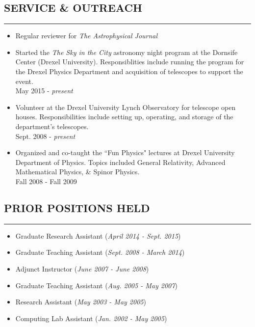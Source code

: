 \documentclass[10pt,a4]{article}
\newcounter{mySaveCounter}
\newcommand\myEnumReset{\setcounter{mySaveCounter}{0}}
\begin{document}
\subsection*{SERVICE \& OUTREACH}
\hrule  height 4pt
\vspace{0.2cm}
\begin{itemize}
  \item Regular reviewer for {\it The Astrophysical Journal}
	\item Started the \textit{The Sky in the City} astronomy night program
	at the Dornsife Center (Drexel University). Responsiblities include
	running the program for the Drexel Physics Department and acquisition
	of telescopes to support the event. \\
	May 2015 - {\it present}
	\item Volunteer at the Drexel University Lynch Observatory for
          telescope open houses. Responsibilities include setting up,
          operating, and storage of the department's telescopes. \\
          Sept. 2008 - {\it present}
	\item Organized and co-taught the ``Fun Physics" lectures at
	Drexel University Department of Physics. Topics included General
	Relativity, Advanced Mathematical Physics, \& Spinor Physics. \\
	Fall 2008 - Fall 2009
\end{itemize}
\myEnumReset

\subsection*{PRIOR POSITIONS HELD}
\hrule  height 4pt
\vspace{0.2cm}




\begin{itemize}
    \item Graduate Research Assistant ({\it April 2014 - Sept. 2015}) \\
    \item Graduate Teaching Assistant ({\it Sept. 2008 - March 2014}) \\
    \item Adjunct Instructor ({\it June 2007 - June 2008}) \\
    \item Graduate Teaching Assistant ({\it Aug. 2005 - May 2007}) \\
    \item Research Assistant ({\it May 2003 - May 2005}) \\
    \item Computing Lab Assistant ({\it Jan. 2002 - May 2005}) \\
\end{itemize}
\end{document}
